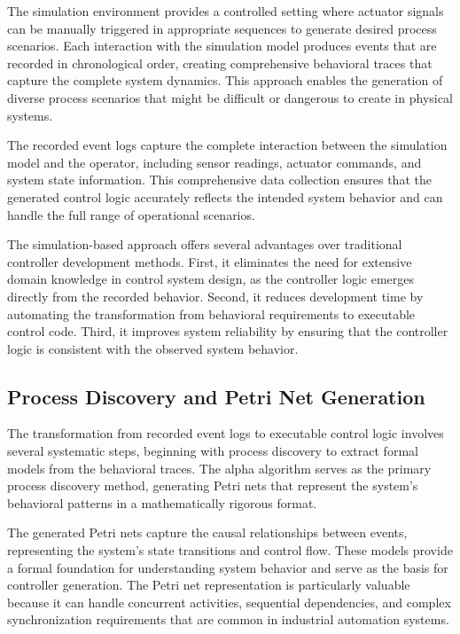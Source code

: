 The simulation environment provides a controlled setting where actuator signals can be manually triggered in appropriate sequences to generate desired process scenarios. Each interaction with the simulation model produces events that are recorded in chronological order, creating comprehensive behavioral traces that capture the complete system dynamics. This approach enables the generation of diverse process scenarios that might be difficult or dangerous to create in physical systems.



The recorded event logs capture the complete interaction between the simulation model and the operator, including sensor readings, actuator commands, and system state information. This comprehensive data collection ensures that the generated control logic accurately reflects the intended system behavior and can handle the full range of operational scenarios.

The simulation-based approach offers several advantages over traditional controller development methods. First, it eliminates the need for extensive domain knowledge in control system design, as the controller logic emerges directly from the recorded behavior. Second, it reduces development time by automating the transformation from behavioral requirements to executable control code. Third, it improves system reliability by ensuring that the controller logic is consistent with the observed system behavior.

\subsection{Process Discovery and Petri Net Generation}

The transformation from recorded event logs to executable control logic involves several systematic steps, beginning with process discovery to extract formal models from the behavioral traces. The alpha algorithm serves as the primary process discovery method, generating Petri nets that represent the system's behavioral patterns in a mathematically rigorous format.

The generated Petri nets capture the causal relationships between events, representing the system's state transitions and control flow. These models provide a formal foundation for understanding system behavior and serve as the basis for controller generation. The Petri net representation is particularly valuable because it can handle concurrent activities, sequential dependencies, and complex synchronization requirements that are common in industrial automation systems.



